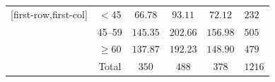 \documentclass{article}\usepackage[]{graphicx}\usepackage[svgnames]{xcolor}
\begin{document}
\begin{itemize}
\begin{table}[H]
\begin{NiceTabular}{c|ccc|c}[first-row,first-col]
                         & $<$45     & $ 66.78 $                                         & $ 93.11 $    & $ 72.12 $  & $ 232 $  \\
                        & 45--59    & $ 145.35 $                                        & $ 202.66 $   & $ 156.98 $ & $ 505 $  \\
                        & $ \ge $60 & $ 137.87 $                                        & $ 192.23 $   & $ 148.90 $ & $ 479 $  \\
                        \midrule
                        & Total     & $ 350 $                                           & $ 488 $      & $ 378 $    & $ 1216 $
                  \end{NiceTabular}
            \end{table}
\end{itemize}
\end{document}
